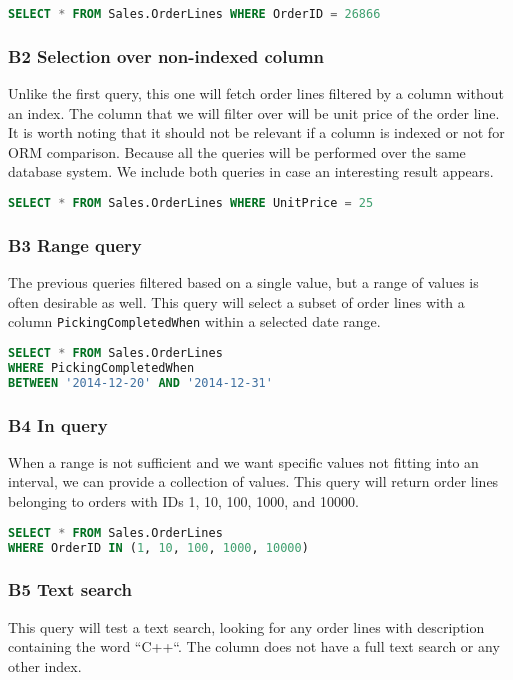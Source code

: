 \begin{lstlisting}[language=SQL]
SELECT * FROM Sales.OrderLines WHERE OrderID = 26866
\end{lstlisting}

\subsubsection*{B2 Selection over non-indexed column} \label{query:b2}
Unlike the first query, this one will fetch order lines filtered by a column without an index. The column that we will filter over will be unit price of the order line.
It is worth noting that it should not be relevant if a column is indexed or not for ORM comparison. Because all the queries will be performed over the same database system. We include both queries in case an interesting result appears.

\begin{lstlisting}[language=SQL]
SELECT * FROM Sales.OrderLines WHERE UnitPrice = 25
\end{lstlisting}

\subsubsection*{B3 Range query} \label{query:b3}
The previous queries filtered based on a single value, but a range of values is often desirable as well.
This query will select a subset of order lines with a column \texttt{PickingCompletedWhen} within a selected date range.

\begin{lstlisting}[language=SQL]
SELECT * FROM Sales.OrderLines 
WHERE PickingCompletedWhen 
BETWEEN '2014-12-20' AND '2014-12-31'
\end{lstlisting}

\subsubsection*{B4 In query} \label{query:b4}
When a range is not sufficient and we want specific values not fitting into an interval, we can provide a collection of values.
This query will return order lines belonging to orders with IDs 1, 10, 100, 1000, and 10000.

\begin{lstlisting}[language=SQL]
SELECT * FROM Sales.OrderLines 
WHERE OrderID IN (1, 10, 100, 1000, 10000)
\end{lstlisting}

\subsubsection*{B5 Text search} \label{query:b5}
This query will test a text search, looking for any order lines with description containing the word ``C++``.  The column does not have a full text search or any other index.

